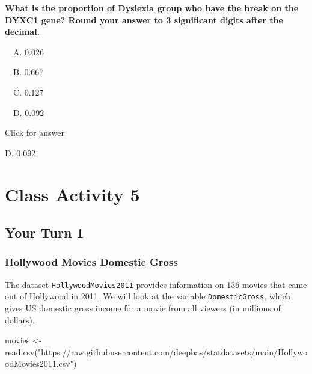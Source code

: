 \documentclass[
]{book}
\newenvironment{Shaded}{\begin{snugshade}}{\end{snugshade}}
\newcommand{\AttributeTok}[1]{\textcolor[rgb]{0.77,0.63,0.00}{#1}}
\newcommand{\FunctionTok}[1]{\textcolor[rgb]{0.00,0.00,0.00}{#1}}
\newcommand{\NormalTok}[1]{#1}
\newcommand{\OtherTok}[1]{\textcolor[rgb]{0.56,0.35,0.01}{#1}}
\newcommand{\SpecialCharTok}[1]{\textcolor[rgb]{0.00,0.00,0.00}{#1}}
\newcommand{\StringTok}[1]{\textcolor[rgb]{0.31,0.60,0.02}{#1}}
\begin{document}
\textbf{What is the proportion of Dyslexia group who have the break on the DYXC1 gene? Round your answer to 3 significant digits after the decimal.}

 A. 0.026

 B. 0.667

 C. 0.127

 D. 0.092

Click for answer

D. 0.092

\hypertarget{class-activity-5}{%
\chapter{Class Activity 5}\label{class-activity-5}}

\hypertarget{your-turn-1-3}{%
\section{Your Turn 1}\label{your-turn-1-3}}

\hypertarget{hollywood-movies-domestic-gross}{%
\subsection{Hollywood Movies Domestic Gross}\label{hollywood-movies-domestic-gross}}

The dataset \texttt{HollywoodMovies2011} provides information on 136 movies that came out of Hollywood in 2011. We will look at the variable \texttt{DomesticGross}, which gives US domestic gross income for a movie from all viewers (in millions of dollars).

\begin{Shaded}
\begin{Highlighting}[]
\NormalTok{movies }\OtherTok{\textless{}{-}} \FunctionTok{read.csv}\NormalTok{(}\StringTok{"https://raw.githubusercontent.com/deepbas/statdatasets/main/HollywoodMovies2011.csv"}\NormalTok{)}
\end{Highlighting}
\end{Shaded}

\begin{Shaded}
\end{Shaded}
\end{document}
